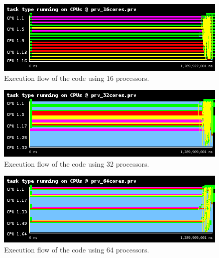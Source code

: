 \documentclass[12pt, a4paper]{article}
\begin{document}
\begin{figure}[H]
	\centering
	\includegraphics[scale=0.75]{./images/S1_scalability/S1_scalability_16}
	
	\label{fig_ann:S1_scalability_16}
	\caption{Execution flow of the code using 16 processors.}
\end{figure}





\begin{figure}[H]
	\centering
	\includegraphics[scale=0.75]{./images/S1_scalability/S1_scalability_32}
	
	\label{fig_ann:S1_scalability_32}
	\caption{Execution flow of the code using 32 processors.}
\end{figure}





\begin{figure}[H]
	\centering
	\includegraphics[scale=0.75]{./images/S1_scalability/S1_scalability_64}
	
	\label{fig_ann:S1_scalability_64}
	\caption{Execution flow of the code using 64 processors.}
\end{figure}
\end{document}
